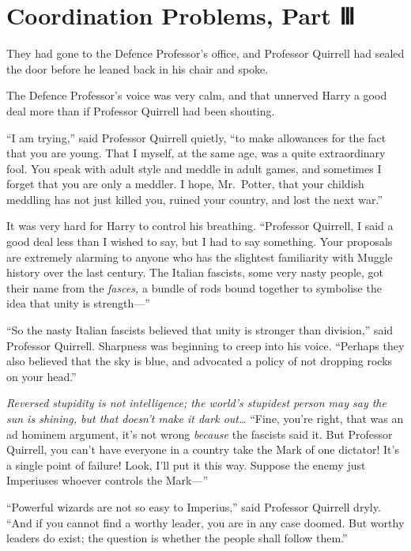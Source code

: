 \chapter{Coordination Problems, Part Ⅲ}

They had gone to the Defence Professor's office, and Professor Quirrell
had sealed the door before he leaned back in his chair and spoke.

The Defence Professor's voice was very calm, and that unnerved Harry a
good deal more than if Professor Quirrell had been shouting.

``I am trying,'' said Professor Quirrell quietly, ``to make allowances
for the fact that you are young. That I myself, at the same age, was a
quite extraordinary fool. You speak with adult style and meddle in adult
games, and sometimes I forget that you are only a meddler. I hope,
Mr.~Potter, that your childish meddling has not just killed you, ruined
your country, and lost the next war.''

It was very hard for Harry to control his breathing. ``Professor
Quirrell, I said a good deal less than I wished to say, but I had to say
something. Your proposals are extremely alarming to anyone who has the
slightest familiarity with Muggle history over the last century. The
Italian fascists, some very nasty people, got their name from the
\emph{fasces,} a bundle of rods bound together to symbolise the idea
that unity is strength---''

``So the nasty Italian fascists believed that unity is stronger than
division,'' said Professor Quirrell. Sharpness was beginning to creep
into his voice. ``Perhaps they also believed that the sky is blue, and
advocated a policy of not dropping rocks on your head.''

\emph{Reversed stupidity is not intelligence; the world's stupidest
person may say the sun is shining, but that doesn't make it dark
out\ldots{}} ``Fine, you're right, that was an ad hominem argument, it's
not wrong \emph{because} the fascists said it. But Professor Quirrell,
you can't have everyone in a country take the Mark of one dictator! It's
a single point of failure! Look, I'll put it this way. Suppose the enemy
just Imperiuses whoever controls the Mark---''

``Powerful wizards are not so easy to Imperius,'' said Professor
Quirrell dryly. ``And if you cannot find a worthy leader, you are in any
case doomed. But worthy leaders do exist; the question is whether the
people shall follow them.''

